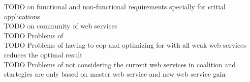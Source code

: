 \documentclass[10pt, conference, compsocconf]{IEEEtran}
\theoremstyle{plain}
\theoremstyle{definition}
\begin{document}
TODO on functional and non-functional requirements specially for critial applications \\

TODO on community of web services \\

TODO Problems of \cite{Chun02user-centricperformance, mcknight00a, DBLP:journals/internet/BenatallahSD03, Khosravifar:2009:AIR:1586636.1586906, Rosario:2008:PQS:1512146.1512290} \\

TODO Problems of \cite {DBLP:conf/IEEEscc/LimTMB12} having to cop and optimizing for with all weak web services reduces the optimal result\\

TODO Problems of \cite {DBLP:conf/IEEEscc/KhosravifarABT11} not considering the current web services in coalition and startegies are only based on master web service and new web service gain\\



%
%
\end{document}

